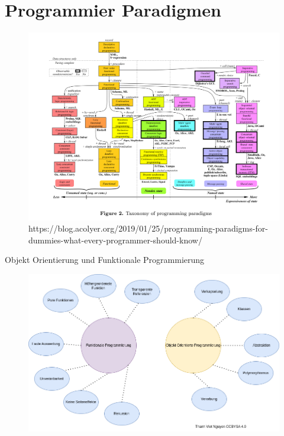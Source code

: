\documentclass{beamer}
\begin{document}
\section{Programmier Paradigmen}
\begin{frame}
	\begin{figure}
	    \centering
	    \includegraphics[width=0.9\linewidth]{bilder/Programming-paradigms.png}
	    \textmd{ \tiny https://blog.acolyer.org/2019/01/25/programming-paradigms-for-dummies-what-every-programmer-should-know/}
	\end{figure}
\end{frame}

\begin{frame}{Objekt Orientierung und Funktionale Programmierung}
\begin{figure}
    \centering
    \includegraphics[scale=0.38]{bilder/Unterschiede.drawio.png}
\end{figure}
\end{frame}
\end{document}
